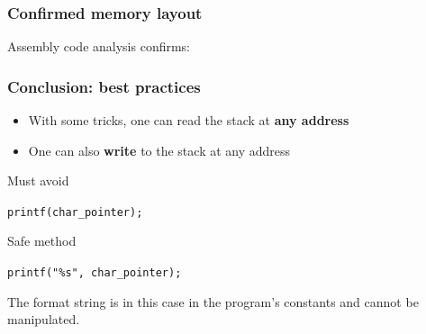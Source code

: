 \documentclass{beamer}
\begin{document}
\begin{frame}[fragile]
\frametitle{Confirmed memory layout}

Assembly code analysis confirms:

\begin{center}
\end{center}

\end{frame}


\begin{frame}
\frametitle{Conclusion: best practices}

\begin{itemize}
\item With some tricks, one can read the stack at \textbf{any address}
\item One can also \textbf{write} to the stack at any address
\end{itemize}

\begin{alertblock}{Must avoid}
\centerline{\texttt{printf(char\_pointer);}}
\end{alertblock}

\begin{exampleblock}{Safe method}
\centerline{\texttt{printf("\%s", char\_pointer);}}
\end{exampleblock}

The format string is in this case in the program's constants and cannot be manipulated.

\end{frame}
\end{document}
